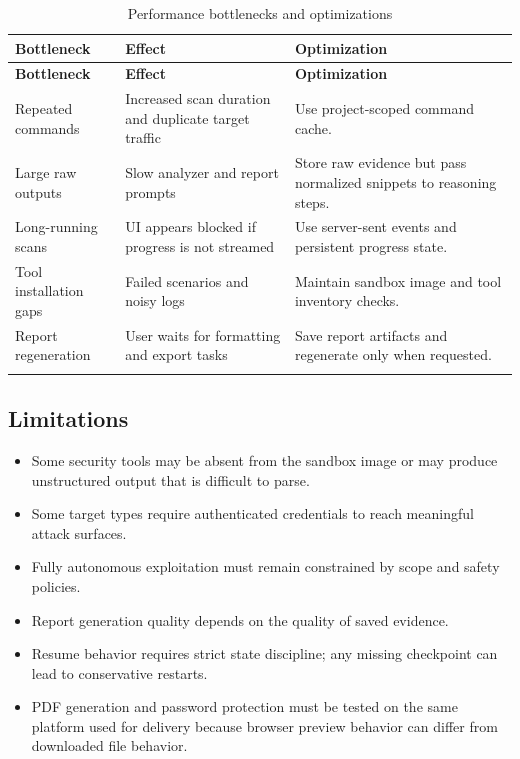\documentclass[12pt,a4paper]{report}
\begin{document}
\begin{longtable}{|p{}|p{}|p{}|}
\hline
\textbf{Bottleneck} & \textbf{Effect} & \textbf{Optimization} \\
\hline
\endfirsthead
\hline
\textbf{Bottleneck} & \textbf{Effect} & \textbf{Optimization} \\
\hline
\endhead
Repeated commands & Increased scan duration and duplicate target traffic & Use
project-scoped command cache. \\
\hline
Large raw outputs & Slow analyzer and report prompts & Store raw evidence but pass
normalized snippets to reasoning steps. \\
\hline
Long-running scans & UI appears blocked if progress is not streamed & Use
server-sent events and persistent progress state. \\
\hline
Tool installation gaps & Failed scenarios and noisy logs & Maintain sandbox image
and tool inventory checks. \\
\hline
Report regeneration & User waits for formatting and export tasks & Save report
artifacts and regenerate only when requested. \\
\hline
\caption{Performance bottlenecks and optimizations}
\label{tab:performance_bottlenecks}
\end{longtable}

\subsection{Limitations}

\begin{itemize}
    \item Some security tools may be absent from the sandbox image or may produce
    unstructured output that is difficult to parse.
    \item Some target types require authenticated credentials to reach meaningful
    attack surfaces.
    \item Fully autonomous exploitation must remain constrained by scope and safety
    policies.
    \item Report generation quality depends on the quality of saved evidence.
    \item Resume behavior requires strict state discipline; any missing checkpoint
    can lead to conservative restarts.
    \item PDF generation and password protection must be tested on the same platform
    used for delivery because browser preview behavior can differ from downloaded
    file behavior.
\end{itemize}
\end{document}
